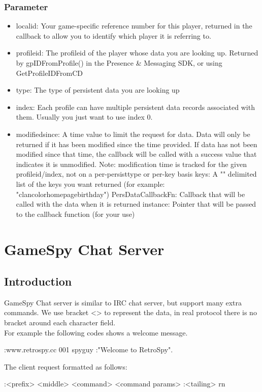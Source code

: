 \documentclass[oneside,titlepage,a4paper]{Definition/retrospy} %
\begin{document}
\section{Parameter}
\begin{itemize}
	\item localid: Your game-specific reference number for this player, returned in the callback
	to allow you to identify which player it is referring to.
	\item profileid: The profileid of the player whose data you are looking up. 
	Returned by gpIDFromProfile() in the Presence \& Messaging SDK, or using GetProfileIDFromCD
\item	type: The type of persistent data you are looking up
\item	index: Each profile can have multiple persistent data records associated with them. Usually you
	just want to use index 0.
\item	modifiedsince: A time value to limit the request for data. Data will only be returned if it has been
	modified since the time provided. If data has not been modified since that time, the callback will be
	called with a success value that indicates it is unmodified.
Note: modification time is tracked for the given profileid/index, not on a per-persisttype or per-key basis
	keys: A "\tbs" delimited list of the keys you want returned (for example: "\tbs clan\tbs color\tbs homepage\tbs birthday")
	PersDataCallbackFn: Callback that will be called with the data when it is returned
	instance: Pointer that will be passed to the callback function (for your use)
\end{itemize}




\part{GameSpy Chat Server}

\chapter{Introduction}
GameSpy Chat server is similar to IRC chat server, but support many extra commands.
We use bracket <> to represent the data, in real protocol there is no bracket around each character field.\\
For example the following codes shows a welcome message.
\begin{mybox}
	:www.retrospy.cc 001 spyguy  :"Welcome to RetroSpy".
\end{mybox}
The client request formatted as follows:
\begin{mybox}[label= Format of the GameSpy chat request]
	:<prefix> <middle> <command> <command params> :<tailing> \tbs r\tbs n
\end{mybox}
\end{document}
